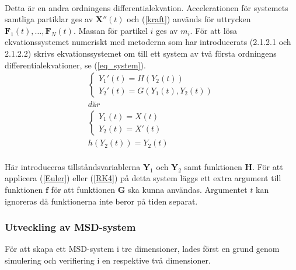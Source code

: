 \documentclass[a4paper,12pt,oneside,final,swedish]{extarticle}
\begin{document}
\\Detta är en andra ordningens differentialekvation. Accelerationen för systemets samtliga partiklar ges av \begin{math}\mathbf X''(t) \end{math} och (\ref{kraft}) används för uttrycken \begin{math}\mathbf F_1(t), …,\mathbf F_N(t) \end{math}. Massan för partikel $i$ ges av $m_i$. För att lösa ekvationssystemet numeriskt med metoderna som har introducerats (2.1.2.1 och 2.1.2.2) skrivs ekvationssystemet om till ett system av två första ordningens differentialekvationer, se (\ref{eq_system}).
\begin{equation}
\begin{split}
  \begin{cases}
    { Y }_{ 1 }'(t)=H(Y_{ 2 }(t))\\
    { Y }_{ 2 }'(t)=G(Y_{ 1 }(t),Y_{ 2 }(t))
  \end{cases}\\
  där\\
  \begin{cases}
    { Y }_{ 1 }(t)=X(t)\\
    { Y }_{ 2 }(t)={ X }'(t)
  \end{cases}\\
  h(Y_{ 2 }(t))=Y_{ 2 }(t)
\end{split}
\label{eq_system}
\end{equation}
\\Här introduceras tillståndsvariablerna \begin{math}\mathbf Y_1 \end{math} och \begin{math}\mathbf Y_2 \end{math} samt funktionen \begin{math}\mathbf H \end{math}. För att applicera (\ref{Euler}) eller (\ref{RK4}) på detta system läggs ett extra argument till funktionen \begin{math}\mathbf f \end{math} för att funktionen \begin{math}\mathbf G \end{math} ska kunna användas. Argumentet $t$ kan ignoreras då funktionerna inte beror på tiden separat.

\subsubsection{Utveckling av MSD-system}
För att skapa ett MSD-system i tre dimensioner, lades först en grund genom simulering och verifiering i en respektive två dimensioner.
\end{document}

